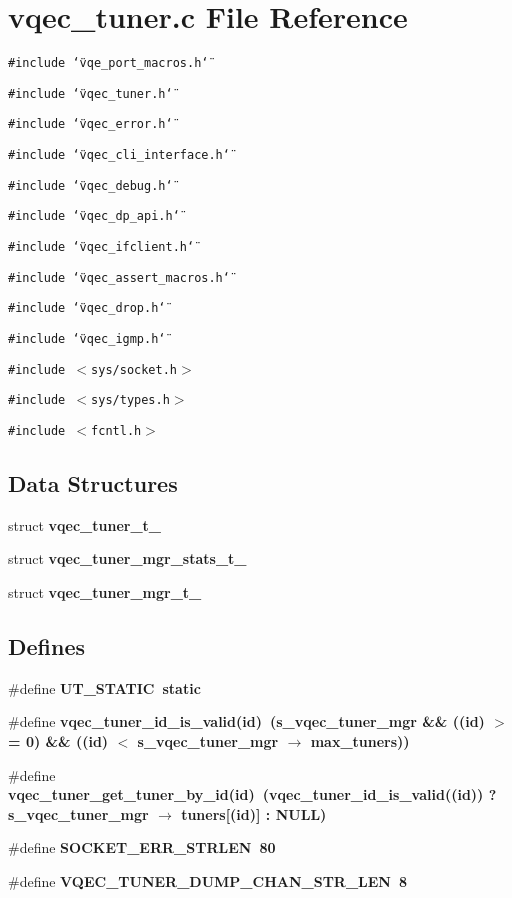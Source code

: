 \section{vqec\_\-tuner.c File Reference}
\label{vqec__tuner_8c}
{\tt \#include \char`\"{}vqe\_\-port\_\-macros.h\char`\"{}}\par
{\tt \#include \char`\"{}vqec\_\-tuner.h\char`\"{}}\par
{\tt \#include \char`\"{}vqec\_\-error.h\char`\"{}}\par
{\tt \#include \char`\"{}vqec\_\-cli\_\-interface.h\char`\"{}}\par
{\tt \#include \char`\"{}vqec\_\-debug.h\char`\"{}}\par
{\tt \#include \char`\"{}vqec\_\-dp\_\-api.h\char`\"{}}\par
{\tt \#include \char`\"{}vqec\_\-ifclient.h\char`\"{}}\par
{\tt \#include \char`\"{}vqec\_\-assert\_\-macros.h\char`\"{}}\par
{\tt \#include \char`\"{}vqec\_\-drop.h\char`\"{}}\par
{\tt \#include \char`\"{}vqec\_\-igmp.h\char`\"{}}\par
{\tt \#include $<$sys/socket.h$>$}\par
{\tt \#include $<$sys/types.h$>$}\par
{\tt \#include $<$fcntl.h$>$}\par
\subsection*{Data Structures}
\begin{CompactItemize}
\item 
struct \bf{vqec\_\-tuner\_\-t\_\-}
\item 
struct \bf{vqec\_\-tuner\_\-mgr\_\-stats\_\-t\_\-}
\item 
struct \bf{vqec\_\-tuner\_\-mgr\_\-t\_\-}
\end{CompactItemize}
\subsection*{Defines}
\begin{CompactItemize}
\item 
\#define \bf{UT\_\-STATIC}~static
\item 
\#define \bf{vqec\_\-tuner\_\-id\_\-is\_\-valid}(id)~(\bf{s\_\-vqec\_\-tuner\_\-mgr} \&\& ((id) $>$= 0) \&\& ((id) $<$ \bf{s\_\-vqec\_\-tuner\_\-mgr} $\rightarrow$ max\_\-tuners))
\item 
\#define \bf{vqec\_\-tuner\_\-get\_\-tuner\_\-by\_\-id}(id)~(vqec\_\-tuner\_\-id\_\-is\_\-valid((id)) ? \bf{s\_\-vqec\_\-tuner\_\-mgr} $\rightarrow$ tuners[(id)] : NULL)
\item 
\#define \bf{SOCKET\_\-ERR\_\-STRLEN}~80
\item 
\#define \bf{VQEC\_\-TUNER\_\-DUMP\_\-CHAN\_\-STR\_\-LEN}~8
\end{CompactItemize}

